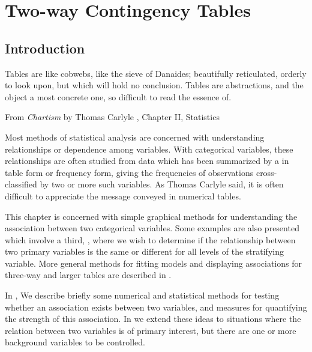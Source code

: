 \documentclass[10pt,krantz2]{krantz}\usepackage[]{graphicx}\usepackage[]{color}
\begin{document}


\chapter{Two-way Contingency Tables}\label{ch:twoway}


\section{Introduction}\label{sec:twoway-intro}
\epigraph{Tables are like cobwebs, like the
sieve of Danaides; beautifully reticulated, orderly to look upon, but
which will hold no conclusion. Tables are abstractions, and the object a most
concrete one, so difficult to read the essence of.}{From \emph{Chartism} by Thomas Carlyle \citeyearpar{Carlyle:1840}, Chapter II, Statistics}

Most methods of statistical analysis are concerned with understanding
relationships or dependence among variables.
With categorical variables, these relationships are often
studied from data which has been
summarized by a 
in table form or frequency form,
giving the frequencies of observations cross-classified
by two or more such variables. As Thomas Carlyle said, it is often difficult
to appreciate the message conveyed in numerical tables.

This chapter is concerned with simple graphical methods for understanding the association
between two categorical variables.
Some examples are also presented which involve a third, ,
where we wish to determine if the relationship between two primary
variables is the same or different for all levels of the
stratifying variable.
More general methods for fitting models and displaying associations for three-way
and larger tables are described in .

In , We describe briefly some numerical
and statistical
methods for testing whether an association
exists between two variables,  and measures
for quantifying the strength
of this association.
In  we extend these ideas to situations where
the relation between two variables is of primary interest, but there
are one or more background variables to be controlled.
\end{document}

